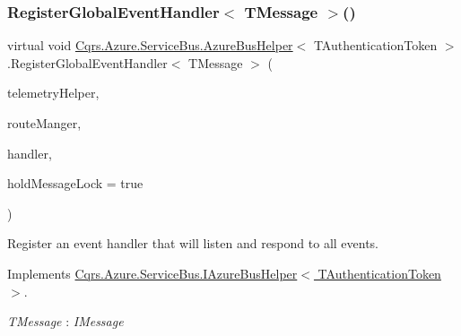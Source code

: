 \subsubsection{\texorpdfstring{Register\+Global\+Event\+Handler$<$ T\+Message $>$()}{RegisterGlobalEventHandler< TMessage >()}}
{\footnotesize\ttfamily virtual void \hyperlink{classCqrs_1_1Azure_1_1ServiceBus_1_1AzureBusHelper}{Cqrs.\+Azure.\+Service\+Bus.\+Azure\+Bus\+Helper}$<$ T\+Authentication\+Token $>$.Register\+Global\+Event\+Handler$<$ T\+Message $>$ (\begin{DoxyParamCaption}\item[{I\+Telemetry\+Helper}]{telemetry\+Helper,  }\item[{\hyperlink{classCqrs_1_1Bus_1_1RouteManager}{Route\+Manager}}]{route\+Manger,  }\item[{Action$<$ T\+Message $>$}]{handler,  }\item[{bool}]{hold\+Message\+Lock = {\ttfamily true} }\end{DoxyParamCaption})\hspace{0.3cm}{\ttfamily [virtual]}}



Register an event handler that will listen and respond to all events. 



Implements \hyperlink{interfaceCqrs_1_1Azure_1_1ServiceBus_1_1IAzureBusHelper_aef39e7d297ccaa36b02ccc3012dc5906_aef39e7d297ccaa36b02ccc3012dc5906}{Cqrs.\+Azure.\+Service\+Bus.\+I\+Azure\+Bus\+Helper$<$ T\+Authentication\+Token $>$}.

\begin{Desc}
\item[Type Constraints]\begin{description}
\item[{\em T\+Message} : {\em I\+Message}]\end{description}
\end{Desc}
\mbox{\label{classCqrs_1_1Azure_1_1ServiceBus_1_1AzureBusHelper_a3b8dd8410756ffdc67782dde8f2519ff_a3b8dd8410756ffdc67782dde8f2519ff}} 

